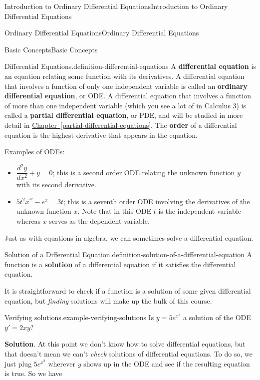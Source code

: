 \documentclass[10pt,]{book}
\newcommand{\terminology}[1]{\textbf{#1}}
\numberwithin{equation}{section}
\newcommand{\dv}[3][]{\dfrac{d^{#1} #2}{d #3^{#1}}}
\begin{document}
\begin{chapterptx}{Introduction to Ordinary Differential Equations}{}{Introduction to Ordinary Differential Equations}{}{}
\begin{sectionptx}{Ordinary Differential Equations}{}{Ordinary Differential Equations}{}{}
\begin{subsectionptx}{Basic Concepts}{}{Basic Concepts}{}{}
\begin{definition}{Differential Equations.}{definition-differential-equations}
\hypertarget{p-5}{}%
A \terminology{differential equation} is an equation relating some function with its derivatives. A differential equation that involves a function of only one independent variable is called an \terminology{ordinary differential equation}, or ODE. A differential equation that involves a function of more than one independent variable (which you see a lot of in Calculus 3) is called a \terminology{partial differential equation}, or PDE, and will be studied in more detail in \hyperref[partial-differential-equations]{Chapter~\ref{partial-differential-equations}}. The \terminology{order} of a differential equation is the highest derivative that appears in the equation.%
\end{definition}
\hypertarget{p-6}{}%
Examples of ODEs: \leavevmode%
\begin{itemize}[label=\textbullet]
\item{}\hypertarget{p-7}{}%
\(\dv[2]{y}{x} + y = 0\); this is a second order ODE relating the unknown function \(y\) with its second derivative.%
\item{}\hypertarget{p-8}{}%
\(5t^{2}x^{'''} - e^{x} = 3t\); this is a seventh order ODE involving the derivatives of the unknown function \(x\). Note that in this ODE \(t\) is the independent variable whereas \(x\) serves as the dependent variable.%
\end{itemize}
%
\par
\hypertarget{p-9}{}%
Just as with equations in algebra, we can sometimes solve a differential equation.%
\begin{definition}{Solution of a Differential Equation.}{definition-solution-of-a-differential-equation}%
\hypertarget{p-10}{}%
A function is a \terminology{solution} of a differential equation if it satisfies the differential equation.%
\end{definition}
\hypertarget{p-11}{}%
It is straightforward to check if a function is a solution of some given differential equation, but \emph{finding} solutions will make up the bulk of this course.%
\begin{example}{Verifying solutions.}{example-verifying-solutions}%
\hypertarget{p-12}{}%
Is \(y = 5e^{x^{2}}\) a solution of the ODE \(y' = 2xy\)?%
\par\smallskip%
\noindent\textbf{Solution}.\hypertarget{solution-1}{}\quad%
\hypertarget{p-13}{}%
At this point we don't know how to solve differential equations, but that doesn't mean we can't \emph{check} solutions of differential equations. To do so, we just plug \(5e^{x^{2}}\) wherever \(y\) shows up in the ODE and see if the resulting equation is true. So we have%

\end{example}
\end{subsectionptx}
\end{sectionptx}
\end{chapterptx}
\end{document}
